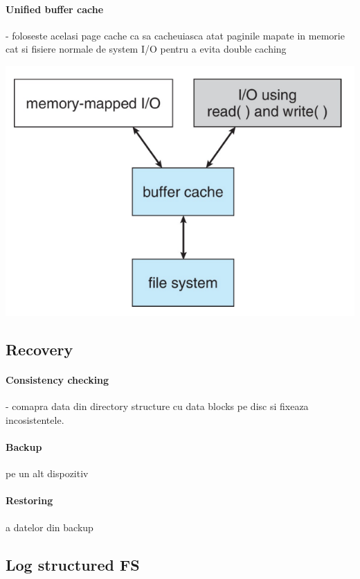 \documentclass{article}
\begin{document}
\paragraph*{Unified buffer cache} - foloseste acelasi page cache ca sa cacheuiasca atat paginile mapate in memorie cat si fisiere normale de system I/O pentru a evita double caching
\begin{center}
    \includegraphics[scale=0.4]{51-ubc.png}
\end{center}

\subsection*{Recovery}
\paragraph*{Consistency checking} - comapra data din directory structure cu data blocks pe disc si fixeaza incosistentele.
\paragraph*{Backup} pe un alt dispozitiv
\paragraph*{Restoring} a datelor din backup

\subsection*{Log structured FS}
\end{document}
